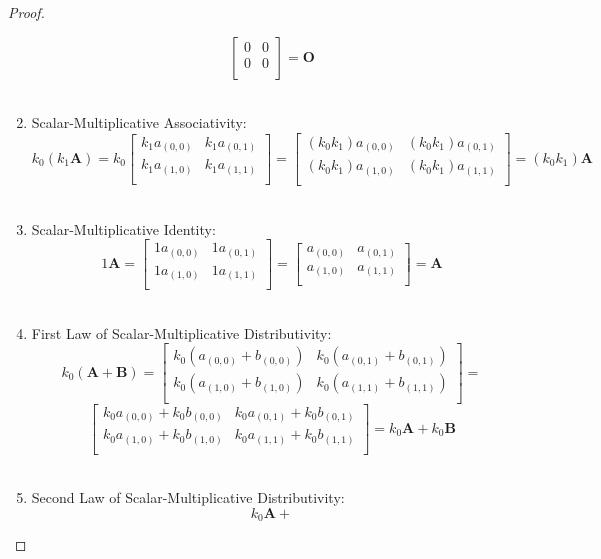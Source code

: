 \documentclass[12pt,oneside]{amsart}
\numberwithin{equation}{section}
\numberwithin{figure}{section}
\theoremstyle{plain}
\theoremstyle{definition}
\begin{document}
\begin{proof}
\begin{enumerate}
\[\begin{bmatrix}
        0 & 0 \\
        0 & 0 \\
      \end{bmatrix} = \mathbf{O}\] \\
    \item Scalar-Multiplicative Associativity: \[k_0(k_1\mathbf{A}) = 
      k_0\begin{bmatrix}
        k_1a_{(0,0)} & k_1a_{(0,1)} \\
        k_1a_{(1,0)} & k_1a_{(1,1)} \\
      \end{bmatrix} = \begin{bmatrix}
        (k_0k_1)a_{(0,0)} & (k_0k_1)a_{(0,1)} \\
        (k_0k_1)a_{(1,0)} & (k_0k_1)a_{(1,1)} \\
      \end{bmatrix} = (k_0k_1)\mathbf{A}\] \\
    \item Scalar-Multiplicative Identity: \[1\mathbf{A} = 
      \begin{bmatrix}
        1a_{(0,0)} & 1a_{(0,1)} \\
        1a_{(1,0)} & 1a_{(1,1)} \\
      \end{bmatrix} = \begin{bmatrix}
        a_{(0,0)} & a_{(0,1)} \\
        a_{(1,0)} & a_{(1,1)} \\
      \end{bmatrix} = \mathbf{A}\] \\
    \item First Law of Scalar-Multiplicative Distributivity: \[k_0(\mathbf{A} + 
        \mathbf{B}) = 
      \begin{bmatrix}
        k_0(a_{(0,0)} + b_{(0,0)}) & k_0(a_{(0,1)} + b_{(0,1)}) \\
        k_0(a_{(1,0)} + b_{(1,0)}) & k_0(a_{(1,1)} + b_{(1,1)}) \\
      \end{bmatrix} = \] \[\begin{bmatrix}
        k_0a_{(0,0)} + k_0b_{(0,0)} & k_0a_{(0,1)} + k_0b_{(0,1)} \\
        k_0a_{(1,0)} + k_0b_{(1,0)} & k_0a_{(1,1)} + k_0b_{(1,1)} \\
      \end{bmatrix} = k_0\mathbf{A} + k_0\mathbf{B}\] \\
    \item Second Law of Scalar-Multiplicative Distributivity: \[k_0\mathbf{A} + 
\]
\end{enumerate}
\end{proof}
\end{document}
